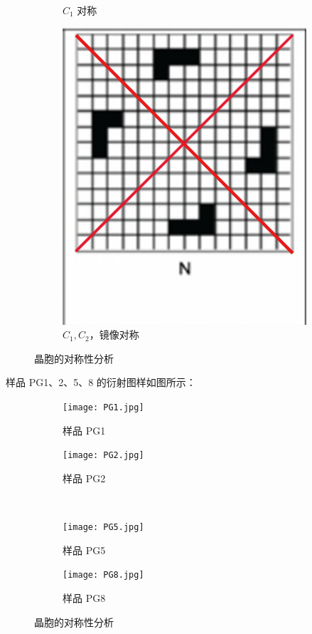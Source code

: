 \documentclass{customDoc}
\begin{document}
\begin{figure}[H]
\begin{subfigure}[b]{0.2\textwidth}
        \caption{$C_1$ 对称}
        \label{fig:symmetry_C}
    \end{subfigure}
    \hfill
    \begin{subfigure}[b]{0.2\textwidth}
        \includegraphics[width=\textwidth]{N.png}
        \caption{$C_1,C_2$，镜像对称}
        \label{fig:symmetry_D}
    \end{subfigure}
    \caption{晶胞的对称性分析}
    \label{fig:symmetry_analysis}
\end{figure}

样品 PG1、2、5、8 的衍射图样如图所示：

\begin{figure}[H]
    \begin{subfigure}[b]{0.45\textwidth}
        \texttt{[image: PG1.jpg]}
        \caption{样品 PG1}
        \label{fig:symmetry_1}
    \end{subfigure}
    \hfill
    \begin{subfigure}[b]{0.45\textwidth}
        \texttt{[image: PG2.jpg]}
        \caption{样品 PG2}
        \label{fig:symmetry_2}
    \end{subfigure}
    \\
    \begin{subfigure}[b]{0.45\textwidth}
        \texttt{[image: PG5.jpg]}
        \caption{样品 PG5}
        \label{fig:symmetry_3}
    \end{subfigure}
    \hfill
    \begin{subfigure}[b]{0.45\textwidth}
        \texttt{[image: PG8.jpg]}
        \caption{样品 PG8}
        \label{fig:symmetry_4}
    \end{subfigure}
    \caption{晶胞的对称性分析}
    \label{fig:symmetry_analysis_complex}
\end{figure}
\end{document}
